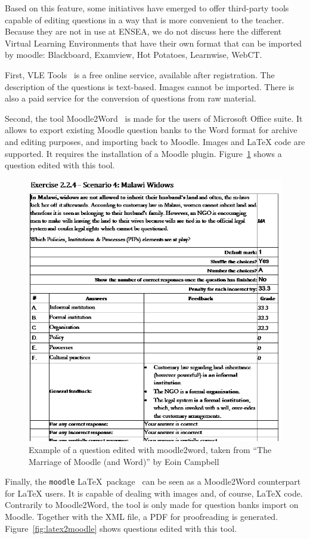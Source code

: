 \documentclass[twocolumn,a4paper,9pt]{article}
\begin{document}
Based on this feature, some initiatives have emerged to offer third-party tools 
capable of editing questions in a way that is more convenient to the teacher. 
Because they are not in use at ENSEA, we do not discuss here the different 
Virtual Learning Environments that have their own format that can be imported 
by moodle: Blackboard, Examview, Hot Potatoes, Learnwise, WebCT.

First, VLE Tools~\cite{vletools} is a free online service, available after 
registration. The description of the questions is text-based. 
Images cannot be imported. There is also a paid service for the conversion of 
questions from raw material.%

Second, the tool Moodle2Word~\cite{moodle2word} is made for 
the users of Microsoft Office suite. It allows to export existing 
Moodle question banks to the Word format for archive and editing purposes, and 
importing back to Moodle. Images and \LaTeX{} code are supported. It requires 
the installation of a Moodle plugin. Figure~\ref{fig:moodle2word} shows a 
question edited with this tool.

\begin{figure}[tbp]
\centering
\includegraphics[width=.5\textwidth]{moodle2word}
\caption{Example of a question edited with moodle2word, taken from ``The 
Marriage of Moodle (and Word)'' by Eoin Campbell}
\label{fig:moodle2word}
\end{figure}

Finally, the \texttt{moodle} \LaTeX\ package~\cite{latex2moodle} can be seen as 
a Moodle2Word counterpart for \LaTeX{} users. It is capable of dealing with 
images and, of course, \LaTeX{} code. Contrarily to Moodle2Word, the tool is 
only made for question banks import on Moodle. Together with the XML file, a 
PDF for proofreading is generated. Figure~\ref{fig:latex2moodle} shows 
questions edited with this tool.
\end{document}
